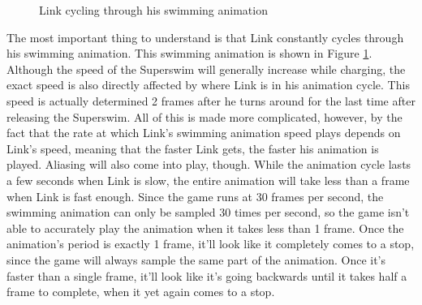 \documentclass[titlepage,12pt,a4paper]{article}
\begin{document}
\begin{figure}[htp]
    \hfill
    \hfill
    \hfill
    \hfill
    \caption{Link cycling through his swimming animation}
    \label{fig:SSFrames}
\end{figure}

The most important thing to understand is that Link constantly cycles through his swimming animation. This swimming animation is shown in Figure \ref{fig:SSFrames}. Although the speed of the Superswim will generally increase while charging, the exact speed is also directly affected by where Link is in his animation cycle. This speed is actually determined 2 frames after he turns around for the last time after releasing the Superswim. All of this is made more complicated, however, by the fact that the rate at which Link's swimming animation speed plays depends on Link's speed, meaning that the faster Link gets, the faster his animation is played. Aliasing will also come into play, though. While the animation cycle lasts a few seconds when Link is slow, the entire animation will take less than a frame when Link is fast enough. Since the game runs at 30 frames per second, the swimming animation can only be sampled 30 times per second, so the game isn't able to accurately play the animation when it takes less than 1 frame. Once the animation's period is exactly 1 frame, it'll look like it completely comes to a stop, since the game will always sample the same part of the animation. Once it's faster than a single frame, it'll  look like it's going backwards until it takes half a frame to complete, when it yet again comes to a stop.  
\end{document}
